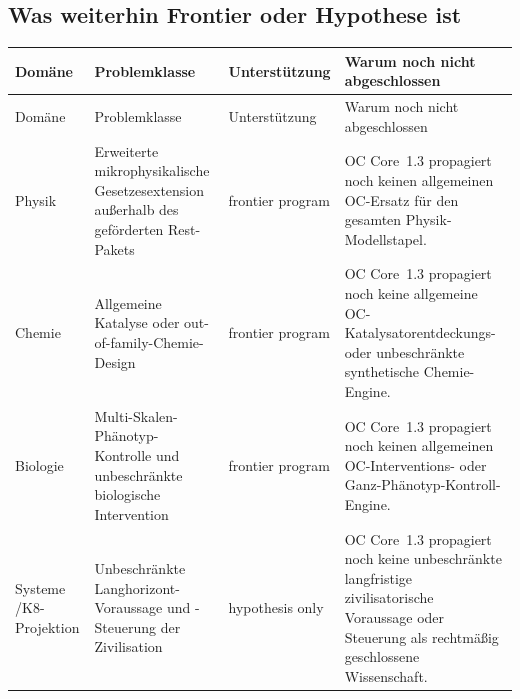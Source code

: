 \subsection{Was weiterhin Frontier oder Hypothese ist}
\begingroup
\scriptsize
\setlength{\emergencystretch}{1.5em}
\setlength{\tabcolsep}{2pt}
\setlength{\LTleft}{0pt}
\setlength{\LTright}{0pt}
\begin{longtable}{@{}L{0.11\textwidth}L{0.19\textwidth}L{0.14\textwidth}L{0.48\textwidth}@{}}
\toprule
Domäne & Problemklasse & Unterstützung & Warum noch nicht abgeschlossen \\
\midrule
\endfirsthead
\toprule
Domäne & Problemklasse & Unterstützung & Warum noch nicht abgeschlossen \\
\midrule
\endhead
Physik & Erweiterte mikrophysikalische Gesetzesextension außerhalb des geförderten Rest-Pakets & frontier program & OC Core~1.3 propagiert noch keinen allgemeinen OC-Ersatz für den gesamten Physik-Modellstapel. \\
Chemie & Allgemeine Katalyse oder out-of-family-Chemie-Design & frontier program & OC Core~1.3 propagiert noch keine allgemeine OC-Katalysatorentdeckungs- oder unbeschränkte synthetische Chemie-Engine. \\
Biologie & Multi-Skalen-Phänotyp-Kontrolle und unbeschränkte biologische Intervention & frontier program & OC Core~1.3 propagiert noch keinen allgemeinen OC-Interventions- oder Ganz-Phänotyp-Kontroll-Engine. \\
Systeme /\allowbreak K8-Projektion & Unbeschränkte Langhorizont-Voraussage und -Steuerung der Zivilisation & hypothesis only & OC Core~1.3 propagiert noch keine unbeschränkte langfristige zivilisatorische Voraussage oder Steuerung als rechtmäßig geschlossene Wissenschaft. \\
\bottomrule
\end{longtable}
\endgroup


